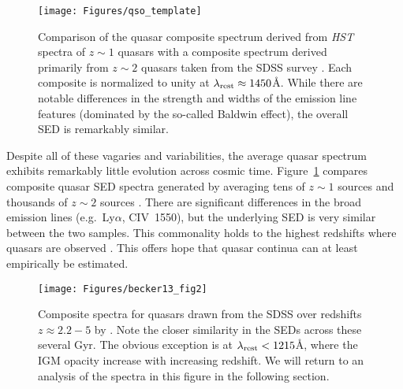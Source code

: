 \documentclass[graybox]{svmult}
\def\lya{Ly$\alpha$}
\begin{document}
%
\begin{figure}[b]
\sidecaption
\texttt{[image: Figures/qso\_template]}
%
%
\caption{Comparison of the quasar composite spectrum derived
from {\it HST} spectra of $z \sim 1$ quasars 
\cite[]{telfer02} with a composite spectrum derived
primarily from $z \sim 2$ quasars taken from the SDSS survey
\cite[]{vanden01}.  Each composite is normalized to unity
at $\lambda_{\rm rest} \approx 1450$\AA.
While there are notable differences in the
strength and widths of the emission line features (dominated
by the so-called Baldwin effect), the overall SED is remarkably
similar.  
}
\label{fig:qso_template}       %
\end{figure}



Despite all of these vagaries and variabilities, the average
quasar spectrum exhibits remarkably little evolution across
cosmic time.  Figure~\ref{fig:qso_template}
compares composite quasar SED spectra generated by
averaging tens of $z \sim 1$ sources \cite{telfer02}
and thousands of $z \sim 2$ sources \cite{vanden01}.
There are significant differences in the broad emission
lines (e.g.\ \lya, CIV~1550), but the underlying
SED is very similar between the two samples.  This commonality
holds to the highest redshifts where quasars are
observed \cite[Figure~\ref{fig:becker13_fig2}][]{becker+13}.
This offers hope that quasar continua can at least
empirically be estimated. 



%
\begin{figure}[b]
\sidecaption
\texttt{[image: Figures/becker13\_fig2]}
%
%
\caption{Composite spectra for quasars drawn
from the SDSS over redshifts $z \approx 2.2-5$
by \cite{becker+13}.  Note the closer similarity
in the SEDs across these several Gyr.  The obvious
exception is at $\lambda_{\rm rest} < 1215$\AA, where
the IGM opacity increase with increasing redshift. 
We will return to an analysis of the spectra in this
figure in the following section.
}
\label{fig:becker13_fig2}       %
\end{figure}
\end{document}
